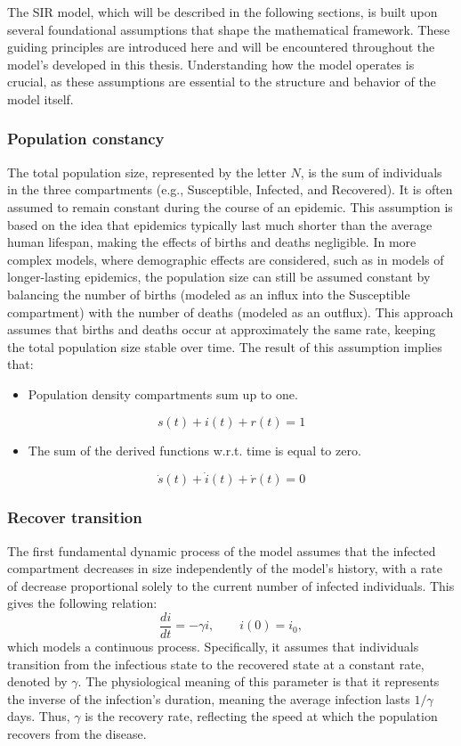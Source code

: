 The SIR model, which will be described in the following sections, is built upon several foundational assumptions that shape the mathematical framework. These guiding principles are introduced here and will be encountered throughout the model's developed in this thesis. Understanding how the model operates is crucial, as these assumptions are essential to the structure and behavior of the model itself.
\subsubsection{Population constancy}
The total population size, represented by the letter $N$, is the sum of individuals in the three compartments (e.g., Susceptible, Infected, and Recovered). It is often assumed to remain constant during the course of an epidemic. This assumption is based on the idea that epidemics typically last much shorter than the average human lifespan, making the effects of births and deaths negligible.
In more complex models, where demographic effects are considered, such as in models of longer-lasting epidemics, the population size can still be assumed constant by balancing the number of births (modeled as an influx into the Susceptible compartment) with the number of deaths (modeled as an outflux). This approach assumes that births and deaths occur at approximately the same rate, keeping the total population size stable over time. The result of this assumption implies that:
\begin{itemize}
	\item Population density compartments sum up to one.
\end{itemize}
\[s(t) + i(t) + r(t)= 1 \]
\begin{itemize}
	\item The sum of the derived functions w.r.t. time is equal to zero.
\end{itemize}
 \[\dot{s}(t)+ \dot{i}(t) + \dot{r}(t)= 0\]

\subsubsection{Recover transition} 
The first fundamental dynamic process of the model assumes that the infected compartment decreases in size independently of the model's history, with a rate of decrease proportional solely to the current number of infected individuals. This gives the following relation:
\[\frac{d i}{dt} = - \gamma i, \qquad i(0) = i_0, \]
which models a continuous process. Specifically, it assumes that individuals transition from the infectious state to the recovered state at a constant rate, denoted by $\gamma$. The physiological meaning of this parameter is that it represents the inverse of the infection's duration, meaning the average infection lasts $1/\gamma$ days. Thus, $\gamma$ is the recovery rate, reflecting the speed at which the population recovers from the disease.
 
